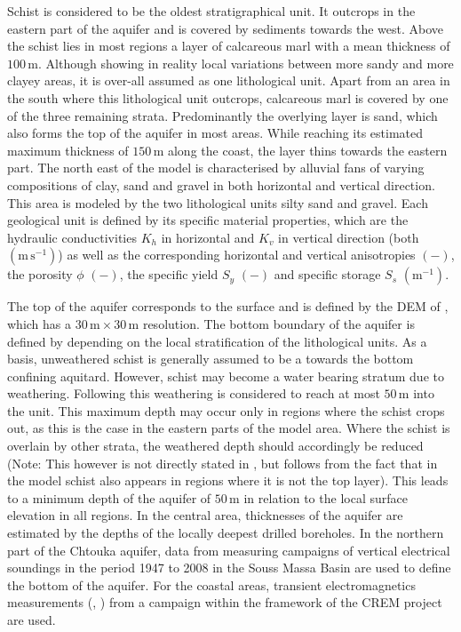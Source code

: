 Schist is considered to be the oldest stratigraphical unit. It outcrops in the eastern part of the aquifer and is covered by sediments towards the west. Above the schist lies in most regions a layer of calcareous marl with a mean thickness of $100 \, \textrm{m}$. Although showing in reality local variations between more sandy and more clayey areas, it is over-all assumed as one lithological unit. Apart from an area in the south where this lithological unit outcrops, calcareous marl is covered by one of the three remaining strata. Predominantly the overlying layer is sand, which also forms the top of the aquifer in most areas. While reaching its estimated maximum thickness of $150 \, \textrm{m}$ along the coast, the layer thins towards the eastern part. The north east of the model is characterised by alluvial fans of varying compositions of clay, sand and gravel in both horizontal and vertical direction. This area is modeled by the two lithological units silty sand and gravel. Each geological unit is defined by its specific material properties, which are the hydraulic conductivities $K_h$ in horizontal and $K_v$ in vertical direction (both $\left( \textrm{m} \, \textrm{s}^{-1} \right)$) as well as the corresponding horizontal and vertical anisotropies $\left( - \right)$, the porosity $\phi$ $\left( - \right)$, the specific yield $S_y$ $\left( - \right)$ and specific storage $S_s$ $\left( \textrm{m}^{-1} \right)$.

The top of the aquifer corresponds to the surface and is defined by the DEM of \cite{NASA.SRTM1Arc}, which has a $30 \, \textrm{m} \times 30 \, \textrm{m}$ resolution. The bottom boundary of the aquifer is defined by \cite{Horn.2021} depending on the local stratification of the lithological units. As a basis, unweathered schist is generally assumed to be a towards the bottom confining aquitard. However, schist may become a water bearing stratum due to weathering. Following \cite{McFadden.2005} this weathering is considered to reach at most $50 \, \textrm{m}$ into the unit. This maximum depth may occur only in regions where the schist crops out, as this is the case in the eastern parts of the model area. Where the schist is overlain by other strata, the weathered depth should accordingly be reduced (Note: This however is not directly stated in \cite{Horn.2021}, but follows from the fact that in the model schist also appears in regions where it is not the top layer). This leads to a minimum depth of the aquifer of $50 \, \textrm{m}$ in relation to the local surface elevation in all regions. In the central area, thicknesses of the aquifer are estimated by the depths of the locally deepest drilled boreholes. In the northern part of the Chtouka aquifer, data from measuring campaigns of vertical electrical soundings in the period 1947 to 2008 in the Souss Massa Basin are used to define the bottom of the aquifer. For the coastal areas, transient electromagnetics measurements (\textcite{Kalberkamp.2021}, \textcite{Terratec.2020}) from a campaign within the framework of the CREM project are used.

